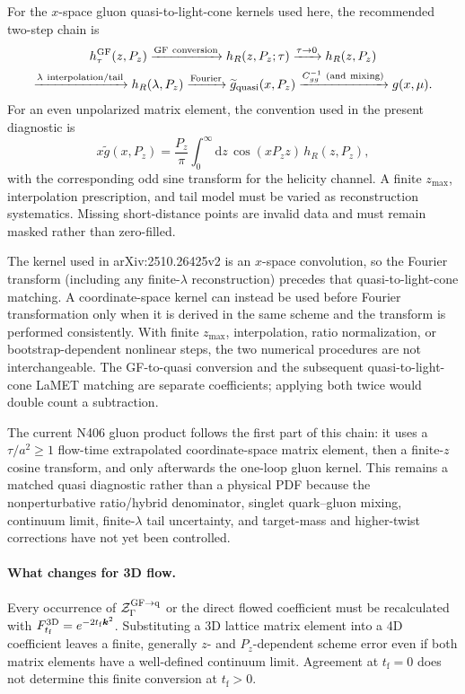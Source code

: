 \documentclass[11pt]{article}
\numberwithin{equation}{section}
\newcommand{\dd}{\mathrm{d}}
\newcommand{\tf}{t_{\mathrm f}}
\begin{document}
For the $x$-space gluon quasi-to-light-cone kernels used here, the recommended
two-step chain is
\begin{equation}
\begin{gathered}
 h_{\tau}^{\rm GF}(z,P_z)
 \xrightarrow{\rm GF\ conversion} h_R(z,P_z;\tau)
 \xrightarrow{\tau\to0} h_R(z,P_z) \\
 \xrightarrow{\lambda\ \rm interpolation/tail} h_R(\lambda,P_z)
 \xrightarrow{\rm Fourier} \widetilde g_{\rm quasi}(x,P_z)
 \xrightarrow{C_{gg}^{-1}\ \rm (and\ mixing)} g(x,\mu).
\end{gathered}
 \label{eq:lambda-fourier-chain}
\end{equation}
For an even unpolarized matrix element, the convention used in the present
diagnostic is
\begin{equation}
 x\widetilde g(x,P_z)
 =\frac{P_z}{\pi}\int_0^{\infty}\!\dd z\,
 \cos(xP_z z)\,h_R(z,P_z),
 \label{eq:gluon-quasi-fourier-order}
\end{equation}
with the corresponding odd sine transform for the helicity channel.  A finite
$z_{\max}$, interpolation prescription, and tail model must be varied as
reconstruction systematics.  Missing short-distance points are invalid data
and must remain masked rather than zero-filled.

The kernel used in arXiv:2510.26425v2 is an $x$-space convolution, so the
Fourier transform (including any finite-$\lambda$ reconstruction) precedes
that quasi-to-light-cone matching.  A coordinate-space kernel can instead be
used before Fourier transformation only when it is derived in the same scheme
and the transform is performed consistently.  With finite $z_{\max}$,
interpolation, ratio normalization, or bootstrap-dependent nonlinear steps,
the two numerical procedures are not interchangeable.  The GF-to-quasi
conversion and the subsequent quasi-to-light-cone LaMET matching are separate
coefficients; applying both twice would double count a subtraction.

The current N406 gluon product follows the first part of this chain: it uses a
$\tau/a^2\ge1$ flow-time extrapolated coordinate-space matrix element, then a
finite-$z$ cosine transform, and only afterwards the one-loop gluon kernel.
This remains a matched quasi diagnostic rather than a physical PDF because
the nonperturbative ratio/hybrid denominator, singlet quark--gluon mixing,
continuum limit, finite-$\lambda$ tail uncertainty, and target-mass and
higher-twist corrections have not yet been controlled.

\paragraph{What changes for 3D flow.}
Every occurrence of \(\mathcal Z_{\Gamma}^{\rm GF\to q}\) or the direct
flowed coefficient must be recalculated with
\(F_{\tf}^{\rm 3D}=e^{-2\tf\bm k^2}\).  Substituting a 3D lattice matrix
element into a 4D coefficient leaves a finite, generally
\(z\)- and \(P_z\)-dependent scheme error even if both matrix elements have a
well-defined continuum limit.  Agreement at \(\tf=0\) does not determine this
finite conversion at \(\tf>0\).
\end{document}
